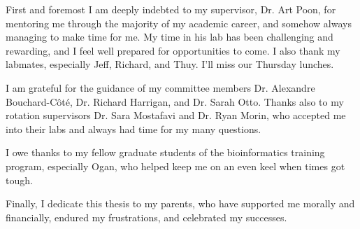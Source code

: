 First and foremost I am deeply indebted to my supervisor, Dr. Art Poon, for
mentoring me through the majority of my academic career, and somehow always
managing to make time for me. My time in his lab has been challenging and
rewarding, and I feel well prepared for opportunities to come. I also thank my
labmates, especially Jeff, Richard, and Thuy. I'll miss our Thursday lunches.

I am grateful for the guidance of my committee members Dr. Alexandre
Bouchard-C\^ot\'e, Dr. Richard Harrigan, and Dr. Sarah Otto. Thanks also to my
rotation supervisors Dr. Sara Mostafavi and Dr. Ryan Morin, who accepted me
into their labs and always had time for my many questions. 

I owe thanks to my fellow graduate students of the bioinformatics training
program, especially Ogan, who helped keep me on an even keel when times got
tough. 

Finally, I dedicate this thesis to my parents, who have supported me morally
and financially, endured my frustrations, and celebrated my successes.
